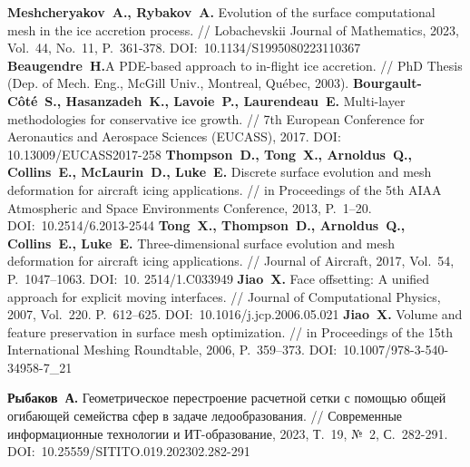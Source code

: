 \begin{thebibliography}{99}
%
\textbf{Meshcheryakov~A., Rybakov~A.} Evolution of the surface computational mesh in the ice accretion process. // Lobachevskii Journal of Mathematics, 2023, Vol.~44, No.~11, P.~361-378. DOI:~10.1134/S1995080223110367
%
\textbf{Beaugendre~H.}A PDE-based approach to in-flight ice accretion. // PhD Thesis (Dep. of Mech. Eng., McGill Univ., Montreal, Qu{\'e}bec, 2003).
%
\textbf{Bourgault-Côté~S., Hasanzadeh~K., Lavoie~P., Laurendeau~E.} Multi-layer methodologies for conservative ice growth. // 7th European Conference for Aeronautics and Aerospace Sciences (EUCASS), 2017. DOI: 10.13009/EUCASS2017-258
%
\textbf{Thompson~D., Tong~X., Arnoldus~Q., Collins~E., McLaurin~D., Luke~E.} Discrete surface evolution and mesh deformation for aircraft icing applications. // in Proceedings of the 5th AIAA Atmospheric and Space Environments Conference, 2013, P.~1–20. DOI:~10.2514/6.2013-2544
%
\textbf{Tong~X., Thompson~D., Arnoldus~Q., Collins~E., Luke~E.} Three-dimensional surface evolution and mesh deformation for aircraft icing applications. // Journal of Aircraft, 2017, Vol.~54, P.~1047–1063. DOI:~10.
2514/1.C033949
%
\textbf{Jiao~X.} Face offsetting: A unified approach for explicit moving interfaces. // Journal of Computational Physics, 2007, Vol.~220. P.~612–625. DOI:~10.1016/j.jcp.2006.05.021
%
\textbf{Jiao~X.} Volume and feature preservation in surface mesh optimization. // in Proceedings of the 15th International Meshing Roundtable, 2006, P.~359–373. DOI:~10.1007/978-3-540-34958-7\_21
%



%
\textbf{Рыбаков~А.} Геометрическое перестроение расчетной сетки с помощью общей огибающей семейства сфер в задаче ледообразования. // Современные информационные технологии и ИТ-образование, 2023, Т.~19, №~2, С.~282-291. DOI:~10.25559/SITITO.019.202302.282-291
%




\end{thebibliography}
